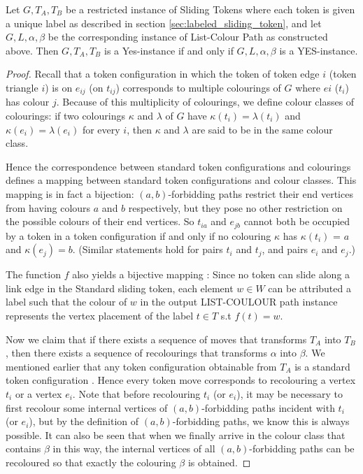\begin{claim} Let $G, T_A, T_B$ be a restricted instance of Sliding Tokens where each token is given a unique label as described in
section \ref{sec:labeled_sliding_token}, and let $G , L, \alpha, \beta$ be the corresponding instance of List-Colour Path as constructed above.
Then $G, T_A, T_B$ is a Yes-instance if and only if $G , L, \alpha, \beta$ is a YES-instance.
\end{claim}\label{theorem:labeled_sliding}

\begin{proof} \cite{bonsma}
Recall that a token configuration in which the token of token edge $i$ (token triangle $i$) is on $e_{ij}$ (on $t_ {ij}$) corresponds
to multiple colourings of $G$ where $ei$ ($t_i$) has colour $j$. Because of this multiplicity of colourings, we define colour classes of
colourings: if two colourings $\kappa$ and $\lambda$ of $G$ have $\kappa(t_i) = \lambda(t_i)$ and $\kappa(e_i) = \lambda(e_i)$ for every $i$,
then $\kappa$ and $\lambda$ are said to be in the same colour class.

Hence the correspondence between standard token configurations and colourings defines a mapping between standard
token configurations and colour classes. This mapping is in fact a bijection: $(a, b)$-forbidding paths restrict their end vertices
from having colours $a$ and $b$ respectively, but they pose no other restriction on the possible colours of their end vertices.
So $t_{ia}$ and $e_{jb}$ cannot both be occupied by a token in a token configuration if and only if no colouring $\kappa$ has $\kappa(t_i)$ = $a$
and $\kappa(e_j) = b$. (Similar statements hold for pairs $t_i$ and $t_j$, and pairs $e_i$ and $e_j$.)

The function $f$ also yields a bijective mapping : Since no token can slide along a link edge in the Standard sliding token,
each element $w \in W$ can be attributed a label such that the colour of $w$ in the output LIST-COULOUR path instance represents
the vertex placement of the label $t \in T$ s.t $f(t) = w$.

Now we claim that if there exists a sequence of moves that transforms $T_A$ into $T_B$, then there exists a sequence of
recolourings that transforms $\alpha$ into $\beta$. We mentioned earlier that any token configuration obtainable from $T_A$ is a standard
token configuration \cite{bonsma}. Hence every token move corresponds to recolouring a vertex $t_i$ or a vertex $e_i$. Note that before
recolouring $t_i$ (or $e_i$), it may be necessary to first recolour some internal vertices of $(a, b)$-forbidding paths incident with
$t_i$ (or $e_i$), but by the definition of $(a, b)$-forbidding paths, we know this is always possible. It can also be seen that when
we finally arrive in the colour class that contains $\beta$ in this way, the internal vertices of all $(a, b)$-forbidding paths can be
recoloured so that exactly the colouring $\beta$ is obtained.


\end{proof}
